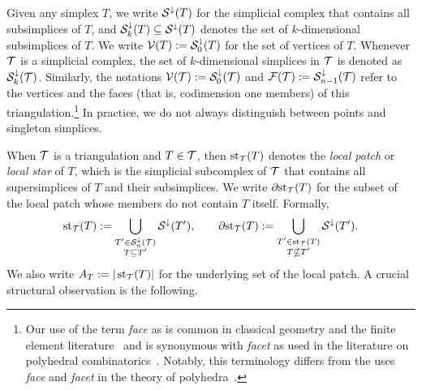 \documentclass[10pt,a4paper]{article}
\newcommand{\mwl}[1]{{\color{red}#1}}
\begin{document}
Given any simplex $T$, we write ${\mathcal S}^{\downarrow}(T)$ for the simplicial complex that contains all subsimplices of $T$,
and ${\mathcal S}^{\downarrow}_{{k}}(T) \subseteq {\mathcal S}^{\downarrow}(T)$ denotes the set of $k$-dimensional subsimplices of $T$. 
We write ${\mathcal V}(T) := {\mathcal S}^{\downarrow}_{0}(T)$ for the set of vertices of $T$.
% 
Whenever ${\mathcal T}$ is a simplicial complex, 
the set of $k$-dimensional simplices in ${\mathcal T}$ is denoted as ${\mathcal S}^{\downarrow}_{{k}}({\mathcal T})$. 
Similarly, the notations ${\mathcal V}({\mathcal T}) := {\mathcal S}^{\downarrow}_{0}({\mathcal T})$ and ${\mathcal F}({\mathcal T}) := {\mathcal S}^{\downarrow}_{n-1}({\mathcal T})$ refer to the vertices and the faces (that is, codimension one members) of this triangulation.\footnote{
    Our use of the term \textit{face} as is common in classical geometry and the finite element literature~\cite{brenner2008mathematical}
    and is synonymous with \textit{facet} as used in the literature on polyhedral combinatorics~\cite{schrijver1998theory}.
    Notably, this terminology differs from the uses \textit{face} and \textit{facet} in the theory of polyhedra~\cite{ziegler1995lectures}.
}
In practice, we do not always distinguish between points and singleton simplices. 

When ${\mathcal T}$ is a triangulation and $T \in {\mathcal T}$, then $\operatorname{st}_{{\mathcal T}}(T)$ denotes the \emph{local patch} or \textit{local star} of $T$, 
which is the simplicial subcomplex of ${\mathcal T}$ that contains all supersimplices of $T$ and their subsimplices. 
We write ${\partial \rm st}_{{\mathcal T}}(T)$ for the subset of the local patch whose members do not contain $T$ itself. 
Formally,
\begin{gather*}
    \operatorname{st}_{{\mathcal T}}(T) := \bigcup_{ \substack{ T' \in {\mathcal S}^{\downarrow}_{n}({\mathcal T}) \\ T \subseteq T' } } {\mathcal S}^{\downarrow}(T'),
    \qquad 
    {\partial \rm st}_{{\mathcal T}}(T) := \bigcup_{ \substack{ T' \in \operatorname{st}_{{\mathcal T}}(T) \\ T \nsubseteq T' } } {\mathcal S}^{\downarrow}(T').
\end{gather*}
We also write $A_T := | \operatorname{st}_{{\mathcal T}}(T) |$ for the underlying set of the local patch. 
A crucial structural observation is the following.
\end{document}
